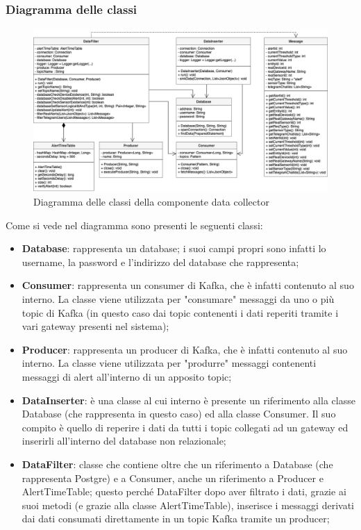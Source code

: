 		\begin{landscape}
		\subsubsection{Diagramma delle classi}%
			\begin{figure}[H]
				\centering
				\includegraphics[scale=0.550]{res/images/DATACOLLECTOR/ClassikafkaDataCollector.png}
				\caption{Diagramma delle classi della componente data collector}
				\label{Diagramma 6}
			\end{figure}
		Come si vede nel diagramma sono presenti le seguenti classi:
		\begin{itemize}
			\item \textbf{Database}: rappresenta un database; i suoi campi propri sono infatti lo username, la password e l'indirizzo del database che rappresenta;
			\item \textbf{Consumer}: rappresenta un consumer di Kafka, che è infatti contenuto al suo interno. La classe viene utilizzata per "consumare" messaggi da uno o più topic di Kafka (in questo caso dai topic contenenti i dati reperiti tramite i vari gateway presenti nel sistema); 
			\item \textbf{Producer}: rappresenta un producer di Kafka, che è infatti contenuto al suo interno. La classe viene utilizzata per "produrre" messaggi contenenti messaggi di alert all'interno di un apposito topic;
			\item \textbf{DataInserter}: è una classe al cui interno è presente un riferimento alla classe Database (che rappresenta  in questo caso) ed alla classe Consumer. Il suo compito è quello di reperire i dati da tutti i topic collegati ad un gateway ed inserirli all'interno del database non relazionale;
			\item \textbf{DataFilter}: classe che contiene oltre che un riferimento a Database (che rappresenta Postgre) e a Consumer, anche un riferimento a Producer e AlertTimeTable; questo perché DataFilter dopo aver filtrato i dati, grazie ai suoi metodi (e grazie alla classe AlertTimeTable), inserisce i messaggi derivati dai dati consumati direttamente in un topic Kafka tramite un producer;

\end{itemize}
\end{landscape}
